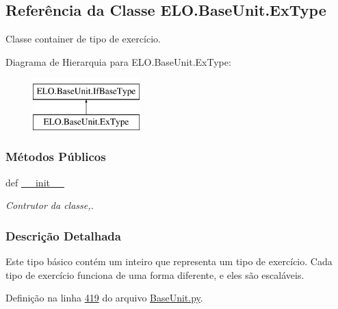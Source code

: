 \hypertarget{classELO_1_1BaseUnit_1_1ExType}{\subsection{Referência da Classe E\-L\-O.\-Base\-Unit.\-Ex\-Type}
\label{classELO_1_1BaseUnit_1_1ExType}
}


Classe container de tipo de exercício.  


Diagrama de Hierarquia para E\-L\-O.\-Base\-Unit.\-Ex\-Type\-:\begin{figure}[H]
\begin{center}
\leavevmode
\includegraphics[height=2.000000cm]{de/d96/classELO_1_1BaseUnit_1_1ExType}
\end{center}
\end{figure}
\subsubsection*{Métodos Públicos}
\begin{DoxyCompactItemize}
\item 
def \hyperlink{classELO_1_1BaseUnit_1_1ExType_aca9932deaf8fe247d16ce17909d3dfbf}{\-\_\-\-\_\-init\-\_\-\-\_\-}
\begin{DoxyCompactList}\small\item\em Contrutor da classe,. \end{DoxyCompactList}\end{DoxyCompactItemize}


\subsubsection{Descrição Detalhada}
Este tipo básico contém um inteiro que representa um tipo de exercício. Cada tipo de exercício funciona de uma forma diferente, e eles são escaláveis. 

Definição na linha \hyperlink{BaseUnit_8py_source_l00419}{419} do arquivo \hyperlink{BaseUnit_8py_source}{Base\-Unit.\-py}.



